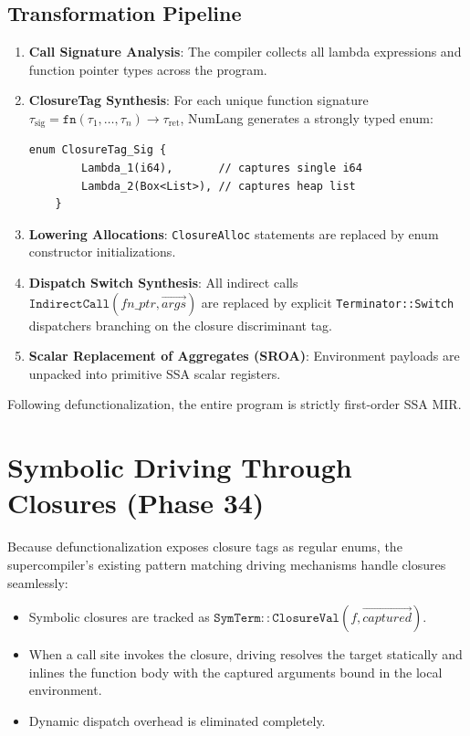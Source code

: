 \subsection{Transformation Pipeline}
\begin{enumerate}
    \item \textbf{Call Signature Analysis}: The compiler collects all lambda expressions and function pointer types across the program.
    \item \textbf{ClosureTag Synthesis}: For each unique function signature $\tau_{\text{sig}} = \mathtt{fn}(\tau_1, \dots, \tau_n) \to \tau_{\text{ret}}$, NumLang generates a strongly typed enum:
    \begin{lstlisting}[language=NumLang]
    enum ClosureTag_Sig {
        Lambda_1(i64),       // captures single i64
        Lambda_2(Box<List>), // captures heap list
    }
    \end{lstlisting}
    \item \textbf{Lowering Allocations}: \texttt{ClosureAlloc} statements are replaced by enum constructor initializations.
    \item \textbf{Dispatch Switch Synthesis}: All indirect calls $\mathtt{IndirectCall}(fn\_ptr, \vec{args})$ are replaced by explicit \texttt{Terminator::Switch} dispatchers branching on the closure discriminant tag.
    \item \textbf{Scalar Replacement of Aggregates (SROA)}: Environment payloads are unpacked into primitive SSA scalar registers.
\end{enumerate}

Following defunctionalization, the entire program is strictly first-order SSA MIR.

\section{Symbolic Driving Through Closures (Phase 34)}
\label{sec:higher_order:driving_closures}

Because defunctionalization exposes closure tags as regular enums, the supercompiler's existing pattern matching driving mechanisms handle closures seamlessly:
\begin{itemize}
    \item Symbolic closures are tracked as $\mathtt{SymTerm::ClosureVal}(f, \vec{captured})$.
    \item When a call site invokes the closure, driving resolves the target statically and inlines the function body with the captured arguments bound in the local environment.
    \item Dynamic dispatch overhead is eliminated completely.
\end{itemize}

